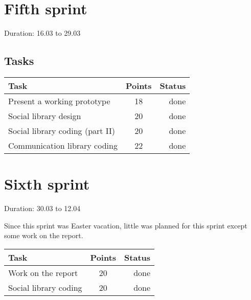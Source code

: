 \section{Fifth sprint}

Duration: 16.03 to 29.03
\subsection{Tasks}



\begin{table}
\begin{tabular}{ | l | c | r | }

\hline
\textbf{Task} & \textbf{Points} & \textbf{Status} \\
\hline

Present a working prototype			& 18 & done \\
\hline
Social library design				& 20 & done \\
\hline
Social library coding (part II)		& 20 & done \\
\hline
Communication library coding		& 22 & done \\
\hline



\end{tabular}
\end{table}

\section{Sixth sprint}

Duration: 30.03 to 12.04

Since this sprint was Easter vacation, little
was planned for this sprint except some work on the report.

\begin{table}
\begin{tabular}{ | l | c | r | }

\hline
\textbf{Task} & \textbf{Points} & \textbf{Status} \\
\hline

Work on the report		& 20 & done \\
\hline
Social library coding	& 20 & done \\
\hline

\end{tabular}
\end{table}
